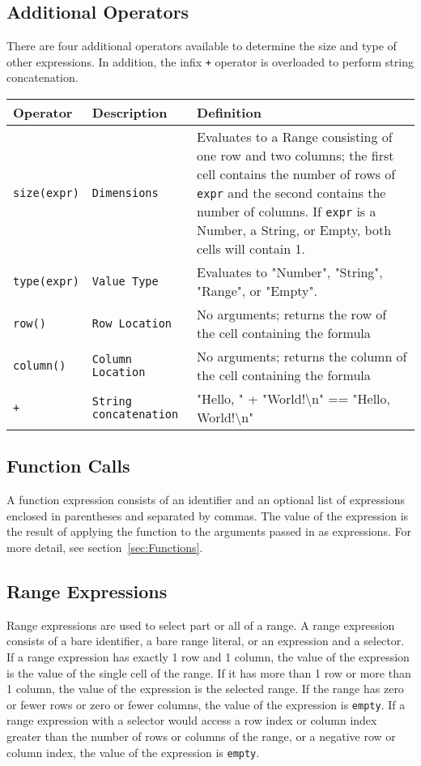 \subsection {Additional Operators}
There are four additional operators available to determine the size and type of other expressions. In addition, the infix \texttt{+} operator is overloaded to perform string concatenation.
\begin{table}[H]
\begin{tabular}{ |p{2cm}|p{3cm}|p{8cm}|  }
\hline
\textbf{Operator} & \textbf{Description} & \textbf{Definition} \\ \hline
\texttt{size(expr)} & \texttt{Dimensions} & {Evaluates to a Range consisting of one row and two columns; the first cell contains the number of rows of \texttt{expr} and the second contains the number of columns. If \texttt{expr} is a Number, a String, or Empty, both cells will contain 1.} \\ \hline
\texttt{type(expr)} & \texttt{Value Type} & {Evaluates to "Number", "String", "Range", or "Empty".} \\ \hline
\texttt{row()} & \texttt{Row Location} & {No arguments; returns the row of the cell containing the formula} \\ \hline
\texttt{column()} & \texttt{Column Location} & {No arguments; returns the column of the cell containing the formula} \\ \hline
\texttt{+} & \texttt{String concatenation} & {"Hello, " + "World!\textbackslash n" == "Hello, World!\textbackslash n"}\\ \hline
\end{tabular}
\end{table}

\subsection {Function Calls}
A function expression consists of an identifier and an optional list of expressions enclosed in parentheses and separated by commas. The value of the expression is the result of applying the function to the arguments passed in as expressions. For more detail, see section~\ref{sec:Functions}.
\subsection{Range Expressions}
Range expressions are used to select part or all of a range. A range expression consists of a bare identifier, a bare range literal, or an expression and a selector. If a range expression has exactly 1 row and 1 column, the value of the expression is the value of the single cell of the range. If it has more than 1 row or more than 1 column, the value of the expression is the selected range. If the range has zero or fewer rows or zero or fewer columns, the value of the expression is \texttt{empty}. If a range expression with a selector would access a row index or column index greater than the number of rows or columns of the range, or a negative row or column index, the value of the expression is \texttt{empty}.
